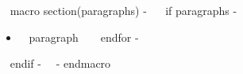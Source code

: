 ~{ macro section(paragraphs) -}~
~{ if paragraphs -}~
\par\vfill
{}
\begin{itemize}[leftmargin=*, topsep=0pt, partopsep=0pt, itemsep=0.1\baselineskip, parsep=0pt]
~{ for paragraph in paragraphs -}~
\item[$\cdot$] ~{{ paragraph }}~
~{ endfor -}~
\end{itemize}
~{ endif -}~
~{- endmacro }~

